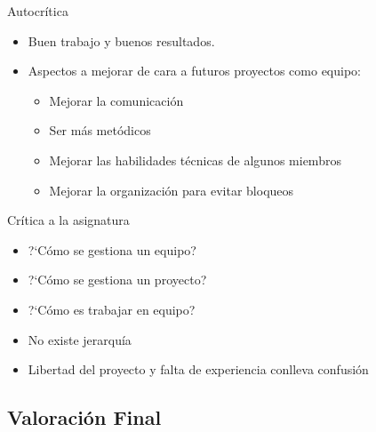 \documentclass{beamer}
\begin{document}
\begin{frame}{Autocr\'itica}
  \begin{itemize}
  \item { Buen trabajo y buenos resultados. }
  \item { Aspectos a mejorar de cara a futuros proyectos como equipo:
    \begin{itemize}
    \item {Mejorar la comunicaci\'on}
    \item {Ser m\'as met\'odicos}
    \item {Mejorar las habilidades t\'ecnicas de algunos miembros}
    \item {Mejorar la organizaci\'on para evitar bloqueos}
    \end{itemize}
  }
  \end{itemize}
\end{frame}

\begin{frame}{Cr\'itica a la asignatura}
  \begin{itemize}
  \item { ?`C\'omo se gestiona un equipo?}
  \item { ?`C\'omo se gestiona un proyecto?}
  \item {?`C\'omo es trabajar en equipo?}
  \end{itemize}
  
    \begin{itemize}
    \item {No existe jerarqu\'ia}
    \item {Libertad del proyecto y falta de experiencia conlleva confusi\'on}
    \end{itemize}
    
\end{frame}

\subsection{Valoraci\'on Final}
\end{document}
